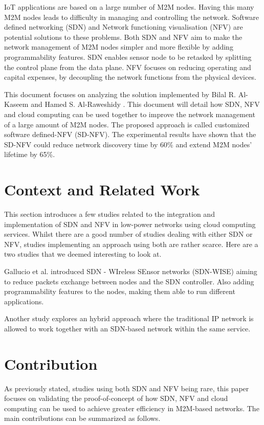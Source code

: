 \documentclass[10pt,journal,compsoc]{IEEEtran}
\begin{document}
IoT applications are based on a large number of M2M nodes. 
Having this many M2M nodes leads to difficulty in 
managing and controlling the network. Software defined networking (SDN) 
and Network functioning visualisation (NFV) are potential solutions to 
these problems. Both SDN and NFV aim to make the network management 
of M2M nodes simpler and more flexible by adding programmability features. 
SDN enables sensor node to be retasked by splitting the control plane from 
the data plane. NFV focuses on reducing operating and capital expenses, 
by decoupling the network functions from the physical devices. 

This document focuses on analyzing the solution implemented by Bilal 
R. Al-Kaseem and Hamed S. Al-Raweshidy \cite{main}. 
This document will detail how SDN, NFV and cloud computing can be used 
together to improve the network management of a large amount of M2M nodes. 
The proposed approach is called customized software defined-NFV (SD-NFV). 
The experimental results have shown that the SD-NFV could reduce 
network discovery time by 60\% and extend M2M nodes' lifetime by 65\%.

\section{Context and Related Work}\label{sec:context}

This section introduces a few studies related to the integration and 
implementation of SDN and NFV in low-power networks using cloud 
computing services. Whilst there are a good number of studies dealing with 
either SDN or NFV, studies implementing an approach using both are 
rather scarce. Here are a two studies that we deemed interesting to look 
at. 

Gallucio et al. \cite{sdn-wise} introduced SDN - WIreless SEnsor 
networks (SDN-WISE) aiming to reduce packets exchange between nodes and 
the SDN controller. Also adding programmability features to the nodes, 
making them able to run different applications. 

Another study \cite{hybrid} explores an hybrid approach where the 
traditional IP network is allowed to work together with an SDN-based 
network within the same service. 

\section{Contribution}\label{sec:contribution}

As previously stated, studies using both SDN and NFV being rare, this paper 
focuses on validating the proof-of-concept of how SDN, NFV and cloud 
computing can be used to achieve greater efficiency in M2M-based networks.
The main contributions can be summarized as follows.
\end{document}
